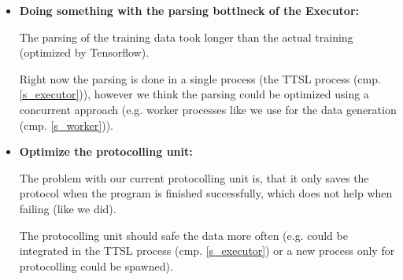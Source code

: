 \begin{itemize}[label={}]
  \item \textbf{Doing something with the parsing
                bottlneck of the Executor:}

        The parsing of the training data took longer than
        the actual training (optimized by Tensorflow).

        Right now the parsing is done in a single process
        (the TTSL process (cmp. \ref{s_executor})), however
        we think the parsing could be optimized using
        a concurrent approach (e.g. worker processes like
        we use for the data generation (cmp.
        \ref{s_worker})).

  \item \textbf{Optimize the protocolling unit:}

        The problem with our current protocolling unit is,
        that it only saves the protocol when the program
        is finished successfully, which does not help when
        failing (like we did).

        The protocolling unit should safe the data more
        often (e.g. could be integrated in the TTSL process
        (cmp. \ref{s_executor}) or a new process only for
        protocolling could be spawned).

\end{itemize}

